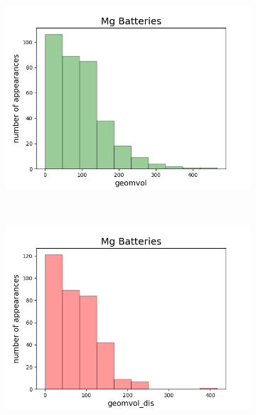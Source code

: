 \begin{figure}[h]
     \centering
     \begin{subfigure}{0.23\textwidth}
         \centering
         \includegraphics[width=\linewidth]{result/figures/distribution/Mg_distrof_geomvol.png}
     \end{subfigure}
     ~ 
     \begin{subfigure}{0.23\textwidth}
         \centering
         \includegraphics[width=\linewidth]{result/figures/distribution/Mg_distrof_geomvol_dis.png}
     \end{subfigure}
          ~ 
     \begin{subfigure}{0.23\textwidth}
         \centering

\end{subfigure}
\end{figure}
